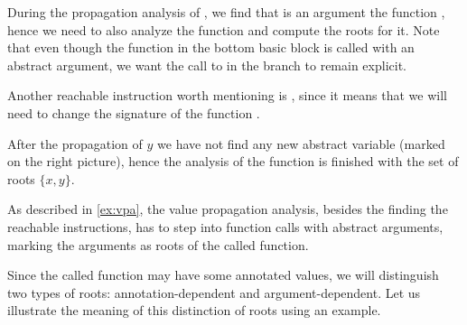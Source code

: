 {\begin{minipage}[bt]{\fullwidth}
\begin{example}
{
}

During the propagation analysis of , we find that  is an
argument the function , hence we need to also analyze the function
 and compute the roots for it. Note that even though the function
 in the bottom basic block is called with an abstract argument, we want
the call to  in the  branch to remain explicit.

Another reachable instruction worth mentioning is , since it means that
we will need to change the signature of the function .

After the propagation of $y$ we have not find any new abstract variable (marked
on the right picture), hence the analysis of the function  is finished
with the set of roots $\{x, y\}$.
\end{example}
\end{minipage}}


As described in \autoref{ex:vpa}, the value propagation analysis, besides
the finding the reachable instructions, has to step into function calls with
abstract arguments, marking the arguments as roots of the called function.

Since the called function may have some annotated values, we will distinguish
two types of roots: annotation-dependent and argument-dependent. Let us
illustrate the meaning of this distinction of roots using an example.

